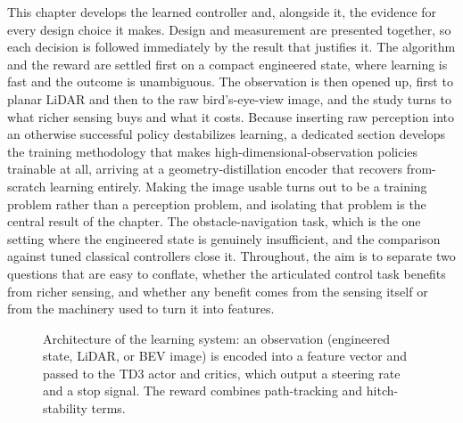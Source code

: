 This chapter develops the learned controller and, alongside it, the evidence for every design choice it makes. Design and measurement are presented together, so each decision is followed immediately by the result that justifies it. The algorithm and the reward are settled first on a compact engineered state, where learning is fast and the outcome is unambiguous. The observation is then opened up, first to planar LiDAR and then to the raw bird's-eye-view image, and the study turns to what richer sensing buys and what it costs. Because inserting raw perception into an otherwise successful policy destabilizes learning, a dedicated section develops the training methodology that makes high-dimensional-observation policies trainable at all, arriving at a geometry-distillation encoder that recovers from-scratch learning entirely. Making the image usable turns out to be a training problem rather than a perception problem, and isolating that problem is the central result of the chapter. The obstacle-navigation task, which is the one setting where the engineered state is genuinely insufficient, and the comparison against tuned classical controllers close it. Throughout, the aim is to separate two questions that are easy to conflate, whether the articulated control task benefits from richer sensing, and whether any benefit comes from the sensing itself or from the machinery used to turn it into features.

\begin{figure}[H]
    \centering
    \resizebox{\textwidth}{!}{}
    \caption{Architecture of the learning system: an observation (engineered state, LiDAR, or BEV image) is encoded into a feature vector and passed to the TD3 actor and critics, which output a steering rate and a stop signal. The reward combines path-tracking and hitch-stability terms.}
    \label{fig:learning_framework}
\end{figure}


